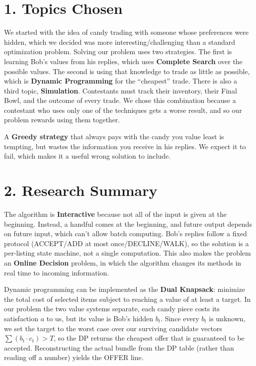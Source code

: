 \documentclass[11pt]{article}
\begin{document}
\section*{1. Topics Chosen}

We started with the idea of candy trading with someone whose preferences were hidden, which we
decided was more interesting/challenging than a standard optimization
problem. Solving our problem uses two strategies. The first is learning Bob's
values from his replies, which uses \textbf{Complete Search} over the possible values.
The second is using that knowledge to trade as little as possible, which is
\textbf{Dynamic Programming} for the ``cheapest'' trade. There is also a third topic,
\textbf{Simulation}. Contestants must track their inventory, their Final Bowl, and the
outcome of every trade. We chose this combination because a contestant who
uses only one of the techniques gets a worse result, and so our problem
rewards using them together.

A \textbf{Greedy strategy} that always pays with the candy you value least is
tempting, but wastes the information you receive in his replies. We expect it
to fail, which makes it a useful wrong solution to include.

\section*{2. Research Summary}

The algorithm is \textbf{Interactive} because not all of the input is given at the
beginning. Instead, a handful comes at the beginning, and future output
depends on future input, which can't allow batch computing. Bob's replies
follow a fixed protocol (ACCEPT/ADD at most once/DECLINE/WALK), so the
solution is a per-listing state machine, not a single computation. This also
makes the problem an \textbf{Online Decision} problem, in which the algorithm changes
its methods in real time to incoming information.

Dynamic programming can be implemented as the \textbf{Dual Knapsack}: minimize the
total cost of selected items subject to reaching a value of at least a
target. In our problem the two value systems separate, each candy piece costs
its satisfaction $a$ to us, but its value is Bob's hidden $b_t$. Since every
$b_t$ is unknown, we set the target to the worst case over our surviving
candidate vectors $\sum(b_t \cdot c_t) > T$, so the DP returns the cheapest
offer that is guaranteed to be accepted. Reconstructing the actual bundle
from the DP table (rather than reading off a number) yields the OFFER line.
\end{document}
